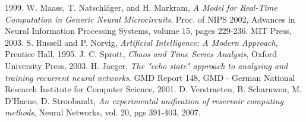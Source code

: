 \documentclass[12pt]{article}
\begin{document}
\begin{thebibliography}{widest-label}
 1999.
 W. Maass, T. Natschl\"ager, and H. Markram,
 \emph{A Model for Real-Time Computation in Generic Neural Microcircuits},
 Proc. of NIPS 2002, 
 Advances in Neural Information Processing Systems, 
 volume 15, 
 pages 229-236. 
 MIT Press, 
 2003.
 S. Russell and P. Norvig,
 \emph{Artificial Intelligence: A Modern Approach},
 Prentice Hall,
 1995.
 J. C. Sprott,
 \emph{Chaos and Time Series Analysis},
 Oxford University Press,
 2003.
  H. Jaeger,
  \emph{The "echo state" approach to analysing and training recurrent neural networks}. 
  GMD Report 148, 
  GMD - German National Research Institute for Computer Science,
  2001.
 D. Verstraeten, B. Scharuwen, M. D'Haene, D. Stroobandt,
 \emph{An experimental unification of reservoir computing methods},
 Neural Networks,
 vol. 20,
 pgs 391-403,
 2007.
\end{thebibliography}
\end{document}
